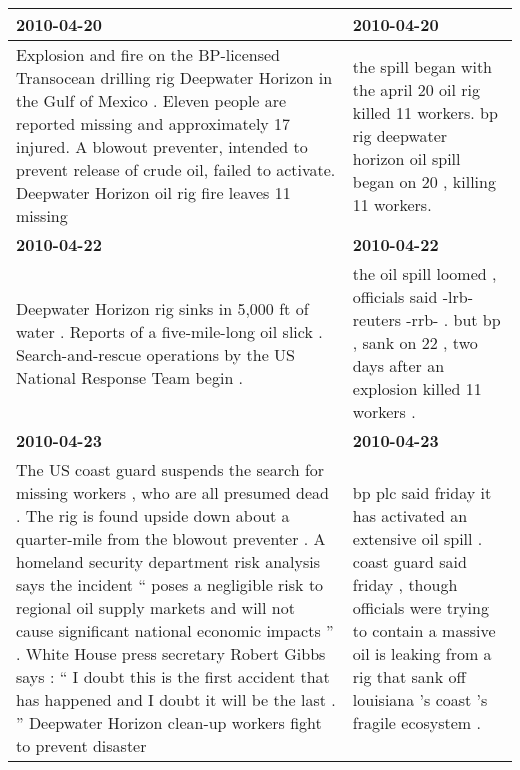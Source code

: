 \documentclass[a4paper,BCOR=10mm]{report}
\numberwithin{lemma}{chapter}
\numberwithin{definition}{chapter}
\begin{document}
\begin{table}
\begin{tabularx}{1.2\textwidth}{|X|X|}
\hline
\textbf{2010-04-20} & \textbf{2010-04-20} \\\hline
Explosion and fire on the BP-licensed Transocean drilling rig Deepwater Horizon in the Gulf of Mexico . \newline Eleven people are reported missing and approximately 17 injured. \newline A blowout preventer, intended to prevent release of crude oil, failed to activate. \newline Deepwater Horizon oil rig fire leaves 11 missing & the spill began with the april 20 oil rig killed 11 workers. \newline bp rig deepwater horizon oil spill began on 20 , killing 11 workers. \\\hline
\textbf{2010-04-22} & \textbf{2010-04-22} \\\hline
Deepwater Horizon rig sinks in 5,000 ft of water . \newline Reports of a five-mile-long oil slick . \newline Search-and-rescue operations by the US National Response Team begin . & the oil spill loomed , officials said -lrb- reuters -rrb- . \newline but bp , sank on 22 , two days after an explosion killed 11 workers . \\\hline
\textbf{2010-04-23} & \textbf{2010-04-23} \\\hline
The US coast guard suspends the search for missing workers , who are all presumed dead . \newline The rig is found upside down about a quarter-mile from the blowout preventer . \newline A homeland security department risk analysis says the incident `` poses a negligible risk to regional oil supply markets and will not cause significant national economic impacts '' . \newline White House press secretary Robert Gibbs says : `` I doubt this is the first accident that has happened and I doubt it will be the last . '' \newline Deepwater Horizon clean-up workers fight to prevent disaster & bp plc said friday it has activated an extensive oil spill . \newline coast guard said friday , though officials were trying to contain a massive oil is leaking from a rig that sank off louisiana 's coast 's fragile ecosystem . \\\hline

\end{tabularx}
\end{table}
\end{document}

